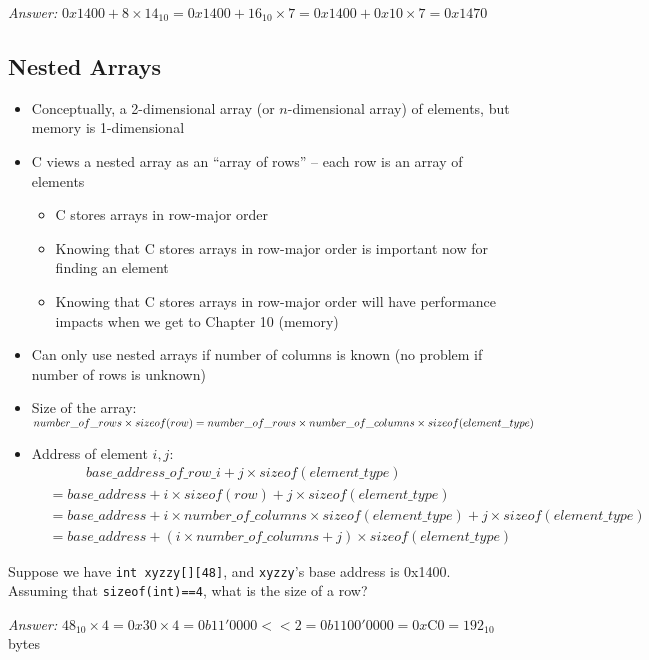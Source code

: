 \documentclass{article}
\begin{document}
\textit{Answer:} $0x1400 + 8 \times 14_{10} = 0x1400 + 16_{10} \times 7 = 0x1400 + 0x10 \times 7 = 0x1470$

\subsection{Nested Arrays}

\begin{itemize}
\item Conceptually, a 2-dimensional array (or $n$-dimensional array) of elements, but memory is 1-dimensional
\item C views a nested array as an ``array of rows'' -- each row is an array of elements
    \begin{itemize}
    \item C stores arrays in row-major order
    \item Knowing that C stores arrays in row-major order is important now for finding an element
    \item Knowing that C stores arrays in row-major order will have performance impacts when we get to Chapter 10 (memory)
    \end{itemize}
\item Can only use nested arrays if number of columns is known (no problem if number of rows is unknown)
\item Size of the array: $number\_of\_rows \times sizeof(row) \\ = number\_of\_rows \times number\_of\_columns \times sizeof(element\_type)$
\item Address of element $i,j$: \\
\begin{align*}
&\phantom{==} base\_address\_of\_row\_i + j \times sizeof(element\_type) \\
&= base\_address + i \times sizeof(row) + j \times sizeof(element\_type) \\
&= base\_address + i \times number\_of\_columns \times sizeof(element\_type) + j \times sizeof(element\_type) \\
&= base\_address + \left( i \times number\_of\_columns + j \right) \times sizeof(element\_type)
\end{align*}
\end{itemize}

Suppose we have \lstinline{int xyzzy[][48]}, and \lstinline{xyzzy}'s base address is 0x1400. Assuming that \lstinline{sizeof(int)==4}, what is the size of a row?

\textit{Answer:} $48_{10} \times 4 = 0x30 \times 4 = 0b11'0000 << 2 = 0b1100'0000 = 0x\textrm{C}0 = 192_{10}$ bytes
\end{document}
